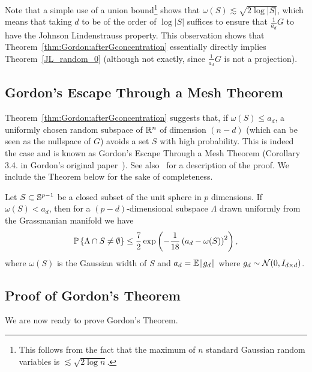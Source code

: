 \begin{remark}
 Note that a simple use of a union bound\footnote{This follows from the fact that the maximum of $n$ standard Gaussian random variables is $\lesssim \sqrt{2\log n}$.} shows that $\omega(S)\lesssim \sqrt{2\log|S|}$, which means that taking $d$ to be of the order of $\log|S|$ suffices to ensure that $\frac1{a_d} G$ to have the Johnson Lindenstrauss property. This observation shows that Theorem~\ref{thm:Gordon:afterGconcentration} essentially directly implies Theorem~\ref{JL_random_0} (although not exactly, since $\frac1{a_d} G$ is not a projection).
\end{remark}


\subsection{Gordon's Escape Through a Mesh Theorem}
Theorem~\ref{thm:Gordon:afterGconcentration} suggests that, if $\omega(S)\leq a_d$, a uniformly chosen random subspace of $\mathbb{R}^n$ of dimension $(n-d)$ (which can be seen as the nullspace of $G$) avoids a set $S$ with high probability. This is indeed the case and is known as Gordon's Escape Through a Mesh Theorem (Corollary 3.4. in Gordon's original paper~\cite{Gordon_EscapeMesh}). See also~\cite{Dustin_blog_gordon} for a description of the proof. We include the Theorem below for the sake of completeness.

\begin{theorem}\label{thm:GordonEscapeMesh}
 Let $S\subset \mathbb{S}^{p-1}$ be a closed subset of the unit sphere in $p$ dimensions. If $\omega(S)<a_d$, then for a $(p-d)$-dimensional subspace $\Lambda$ drawn uniformly from the Grassmanian manifold we have
\[
{\mathbb{P}}\left\{ \Lambda \cap S \neq \emptyset   \right\}  \leq \frac72 \exp \left( -\frac1{18} \left( a_d - \omega(S) \right)^2 \right),
\]
where $\omega(S)$ is the Gaussian width of $S$ and $a_d = \mathbb{E}\|g_d\|$ where $g_d\sim \mathcal{N}(0,I_{d\times d})$.
\end{theorem}







\subsection{Proof of Gordon's Theorem}

We are now ready to prove Gordon's Theorem.

